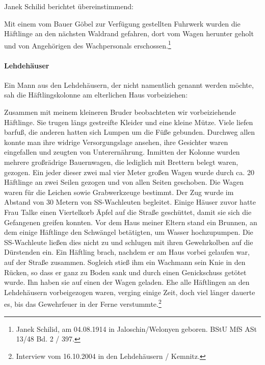 Janek Schilid berichtet übereinstimmend:
\begin{leftbar}
Mit einem vom Bauer Göbel zur Verfügung gestellten Fuhrwerk wurden die Häftlinge an den nächsten Waldrand gefahren, dort vom Wagen herunter geholt und von Angehörigen des Wachpersonals erschossen.\footnote{Janek Schilid, am 04.08.1914 in Jaloschin/Welonyen geboren. BStU MfS ASt 13/48 Bd. 2 / 397.}
\end{leftbar}

\newpage
\paragraph{Lehdehäuser}
Ein Mann aus den Lehdehäusern, der nicht namentlich genannt werden möchte, sah die Häftlingskolonne am elterlichen Haus vorbeiziehen:
\begin{leftbar} 
Zusammen mit meinem kleineren Bruder beobachteten wir vorbeiziehende Häftlinge. Sie trugen längs gestreifte Kleider und eine kleine Mütze. Viele liefen barfuß, die anderen hatten sich Lumpen um die Füße gebunden. Durchweg allen konnte man ihre widrige Versorgungslage ansehen, ihre Gesichter waren eingefallen und zeugten von Unterernährung. Inmitten der Kolonne wurden mehrere großrädrige Bauernwagen, die lediglich mit Brettern belegt waren, gezogen. Ein jeder dieser zwei mal vier Meter großen Wagen wurde durch ca. 20 Häftlinge an zwei Seilen gezogen und von allen Seiten geschoben. Die Wagen waren für die Leichen sowie Grabwerkzeuge bestimmt. Der Zug wurde im Abstand von 30 Metern von SS-Wachleuten begleitet.\newline
Einige Häuser zuvor hatte Frau Talke einen Viertelkorb Äpfel auf die Straße geschüttet, damit sie sich die Gefangenen greifen konnten. Vor dem Haus meiner Eltern stand ein Brunnen, an dem einige Häftlinge den Schwängel betätigten, um Wasser hochzupumpen. Die SS-Wachleute ließen dies nicht zu und schlugen mit ihren Gewehrkolben auf die Dürstenden ein. Ein Häftling brach, nachdem er am Haus vorbei gelaufen war, auf der Straße zusammen. Sogleich stieß ihm ein Wachmann sein Knie in den Rücken, so dass er ganz zu Boden sank und durch einen Genickschuss getötet wurde. Ihn haben sie auf einen der Wagen geladen. Ehe alle Häftlingen an den Lehdehäusern vorbeigezogen waren, verging einige Zeit, doch viel länger dauerte es, bis das Gewehrfeuer in der Ferne verstummte.\footnote{Interview vom 16.10.2004 in den Lehdehäusern / Kemnitz.}
\end{leftbar}

